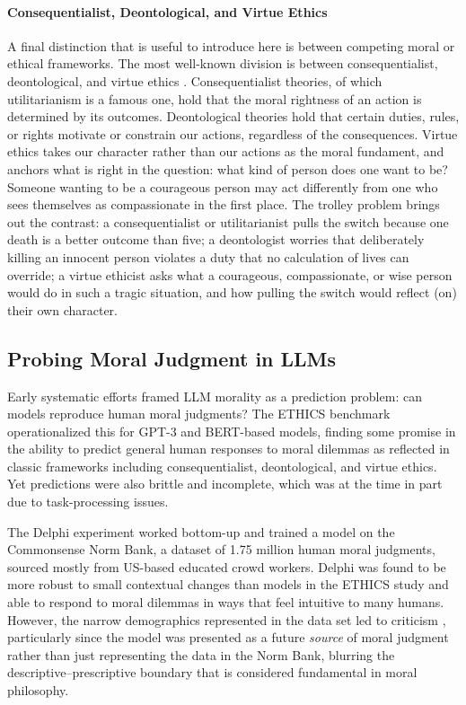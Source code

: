 \paragraph{Consequentialist, Deontological, and Virtue Ethics} A final distinction that is useful to introduce here is between competing moral or ethical frameworks. The most well-known division is between consequentialist, deontological, and virtue ethics \citep{shaferlandau2024fundamentals}. Consequentialist theories, of which utilitarianism is a famous one, hold that the moral rightness of an action is determined by its outcomes. Deontological theories hold that certain duties, rules, or rights motivate or constrain our actions, regardless of the consequences. Virtue ethics takes our character rather than our actions as the moral fundament, and anchors what is right in the question: what kind of person does one want to be? Someone wanting to be a courageous person may act differently from one who sees themselves as compassionate in the first place. The trolley problem brings out the contrast: a consequentialist or utilitarianist pulls the switch because one death is a better outcome than five; a deontologist worries that deliberately killing an innocent person violates a duty that no calculation of lives can override; a virtue ethicist asks what a courageous, compassionate, or wise person would do in such a tragic situation, and how pulling the switch would reflect (on) their own character.

\subsection{Probing Moral Judgment in LLMs}
Early systematic efforts framed LLM morality as a prediction problem: can models reproduce human moral judgments? The ETHICS benchmark %
\citep{hendrycks2020aligning} operationalized this for GPT-3 and BERT-based models, finding some promise in the ability to predict general human responses to moral dilemmas as reflected in classic frameworks including consequentialist, deontological, and virtue ethics. Yet predictions were also brittle and incomplete, which was at the time in part due to task-processing issues. 

The Delphi experiment \citep{jiang2025delphi} worked bottom-up and trained a model on the Commonsense Norm Bank, a dataset of 1.75 million human moral judgments, sourced mostly from US-based educated crowd workers. Delphi was found to be more robust to small contextual changes than models in the ETHICS study and able to respond to moral dilemmas in ways that feel intuitive to many humans. However, the narrow demographics represented in the data set led to criticism \citep{rystrom2023apolitical}, particularly since the model was presented as a future \emph{source} of moral judgment rather than just representing the data in the Norm Bank, blurring the descriptive--prescriptive boundary that is considered fundamental in moral philosophy.

